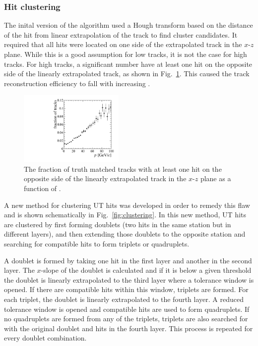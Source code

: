 \subsubsection{Hit clustering}

The inital version of the \velout algorithm used a Hough transform based on the distance of the hit from linear extrapolation of the \velo track to find cluster candidates. It required that all hits were located on one side of the extrapolated \velo track in the $x$-$z$ plane. While this is a good assumption for low \ptot tracks, it is not the case for high \ptot tracks. For high \ptot tracks, a significant number have at least one hit on the opposite side of the linearly extrapolated \velo track, as shown in Fig.~\ref{fig:wrong_side_hits}. This caused the track reconstruction efficiency to fall with increasing \ptot.

\begin{figure}[!tb]
\centering
\includegraphics[width=0.45\textwidth]{figs/upstream-tracking-upgrade/wrong_side_hits.pdf}
\caption{The fraction of truth matched tracks with at least one hit on the opposite side of the linearly extrapolated \velo track in the $x$-$z$ plane as a function of \ptot.}
\label{fig:wrong_side_hits}
\end{figure}

A new method for clustering UT hits was developed in order to remedy this flaw and is shown schematically in Fig.~\ref{fig:clustering}. In this new method, UT hits are clustered by first forming doublets (two hits in the same station but in different layers), and then extending those doublets to the opposite station and searching for compatible hits to form triplets or quadruplets. 
 
A doublet is formed by taking one hit in the first layer and another in the second layer. The $x$-slope of the doublet is calculated and if it is below a given threshold the doublet is linearly extrapolated to the third layer where a tolerance window is opened. If there are compatible hits within this window, triplets are formed. For each triplet, the doublet is linearly extrapolated to the fourth layer. A reduced tolerance window is opened and compatible hits are used to form quadruplets. If no quadruplets are formed from any of the triplets, triplets are also searched for with the original doublet and hits in the fourth layer. This process is repeated for every doublet combination.
 
